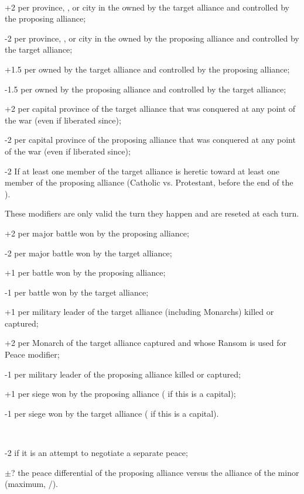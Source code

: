 ~
\begin{modlist}
\item[+2] per province, \TP\faceplus, \COL or city in the \ROTW owned by the
  target alliance and controlled by the proposing alliance;
\item[-2] per province, \TP\faceplus, \COL or city in the \ROTW owned by the
  proposing alliance and controlled by the target alliance;
\item[+1.5] per \TP\facemoins owned by the target alliance and controlled by
  the proposing alliance;
\item[-1.5] per \TP\facemoins owned by the proposing alliance and controlled
  by the target alliance;
\item[+2] per capital province of the target alliance that was conquered at
  any point of the war (even if liberated since);
\item[-2] per capital province of the proposing alliance that was conquered at
  any point of the war (even if liberated since);
\item[-2] If at least one member of the target alliance is heretic toward at
  least one member of the proposing alliance (Catholic vs. Protestant, before
  the end of the ).
\end{modlist}
 These modifiers are only valid the turn
they happen and are reseted at each turn.
\begin{modlist}
\item[+2] per major battle won by the proposing alliance;
\item[-2] per major battle won by the target alliance;  
\item[+1] per battle won by the proposing alliance;
\item[-1] per battle won by the target alliance;
\item[+1] per military leader of the target alliance (including Monarchs)
  killed or captured;
\item[+2] per Monarch of the target alliance captured and whose Ransom is used
  for Peace modifier;
\item[-1] per military leader of the proposing alliance killed or captured;
\item[+1] per siege won by the proposing alliance ( if this is a
  capital);
\item[-1] per siege won by the target alliance ( if this is a
  capital).
\end{modlist}
~
\begin{modlist}
\item[-2] if it is an attempt to negotiate a separate peace;
\item[$\pm$?] the peace differential of the proposing alliance versus the
  alliance of the minor (maximum, /). 
\end{modlist}

